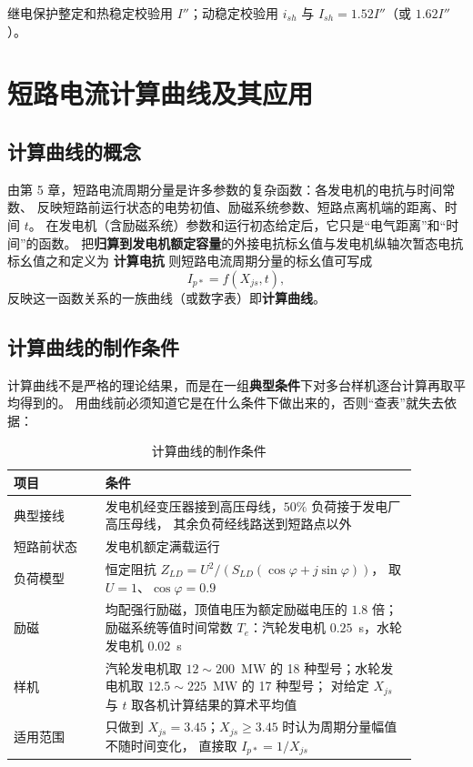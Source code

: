 继电保护整定和热稳定校验用 $I''$；动稳定校验用 $i_{sh}$ 与 $I_{sh}=1.52I''$（或 $1.62I''$）。

\section{短路电流计算曲线及其应用}

\subsection{计算曲线的概念}

由第 5 章，短路电流周期分量是许多参数的复杂函数：各发电机的电抗与时间常数、
反映短路前运行状态的电势初值、励磁系统参数、短路点离机端的距离、时间 $t$。
在发电机（含励磁系统）参数和运行初态给定后，它只是“电气距离”和“时间”的函数。
把\textbf{归算到发电机额定容量}的外接电抗标幺值与发电机纵轴次暂态电抗标幺值之和定义为
\textbf{计算电抗}
则短路电流周期分量的标幺值可写成
\begin{equation}
  I_{p*}=f\left(X_{js},t\right),
\end{equation}
反映这一函数关系的一族曲线（或数字表）即\textbf{计算曲线}。

\subsection{计算曲线的制作条件}

计算曲线不是严格的理论结果，而是在一组\textbf{典型条件}下对多台样机逐台计算再取平均得到的。
用曲线前必须知道它是在什么条件下做出来的，否则“查表”就失去依据：

\begin{table}[htbp]
  \centering
  \caption{计算曲线的制作条件}
  \small
  \begin{tabular}{@{}p{0.20\linewidth}p{0.68\linewidth}@{}}
    \toprule
    项目 & 条件 \\
    \midrule
    典型接线 & 发电机经变压器接到高压母线，$50\%$ 负荷接于发电厂高压母线，
               其余负荷经线路送到短路点以外 \\
    短路前状态 & 发电机额定满载运行 \\
    负荷模型 & 恒定阻抗 $Z_{LD}=U^{2}/\left(S_{LD}(\cos\varphi+j\sin\varphi)\right)$，
               取 $U=1$、$\cos\varphi=0.9$ \\
    励磁 & 均配强行励磁，顶值电压为额定励磁电压的 $1.8$ 倍；
           励磁系统等值时间常数 $T_e$：汽轮发电机 $0.25$~s，水轮发电机 $0.02$~s \\
    样机 & 汽轮发电机取 $12\sim200$~MW 的 18 种型号；水轮发电机取 $12.5\sim225$~MW 的 17 种型号；
           对给定 $X_{js}$ 与 $t$ 取各机计算结果的算术平均值 \\
    适用范围 & 只做到 $X_{js}=3.45$；$X_{js}\ge3.45$ 时认为周期分量幅值不随时间变化，
               直接取 $I_{p*}=1/X_{js}$ \\
    \bottomrule
  \end{tabular}
\end{table}

